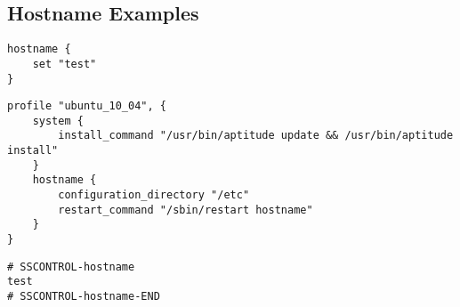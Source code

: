 \subsection{Hostname Examples}

\begin{lstlisting}[style=Sscontrol,
label={lst:hostname_example_script},
title={Sets the host name.}]
hostname {
    set "test"
}
\end{lstlisting}

\begin{lstlisting}[style=Sscontrol,
label={lst:hostname_ubuntu_profile},
title={Ubuntu hostname profile.}]
profile "ubuntu_10_04", {
    system {
        install_command "/usr/bin/aptitude update && /usr/bin/aptitude install"
    }
    hostname {
        configuration_directory "/etc"
        restart_command "/sbin/restart hostname"
    }
}
\end{lstlisting}

\begin{lstlisting}[style=rcfile_nonumbers,
label={lst:hostname_example},
title={Hostname configuration file example.}]
# SSCONTROL-hostname
test
# SSCONTROL-hostname-END
\end{lstlisting}

